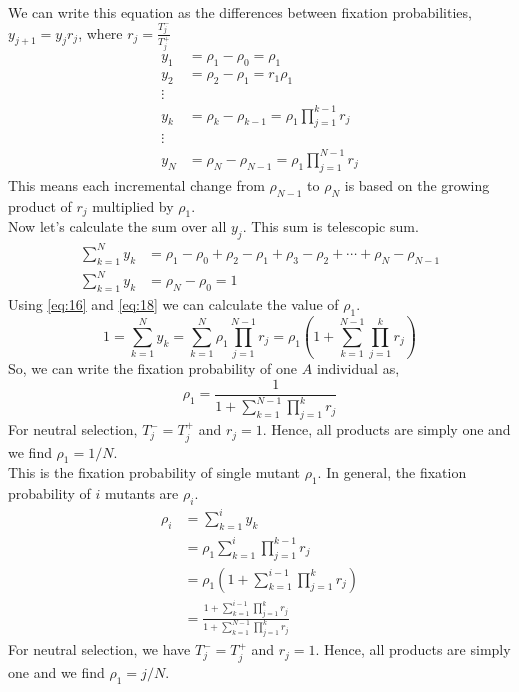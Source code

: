\documentclass{article}
\begin{document}
We can write this equation as the differences between fixation probabilities, $y_{j+1}=y_jr_j$, where $r_j=\frac{T_j^-}{T_j^+}$
\begin{align}
y_1 &= \rho_1 - \rho_0 = \rho_1 \nonumber\\
y_2 &= \rho_2 - \rho_1 = r_1 \rho_1 \nonumber\\
\vdots \nonumber\\
y_k &= \rho_k - \rho_{k-1} = \rho_1 \prod_{j=1}^{k-1} r_j \label{eq:18}\\
\vdots \nonumber\\
y_N &= \rho_N - \rho_{N-1} = \rho_1 \prod_{j=1}^{N-1} r_j \label{eq:19}
\end{align}
This means each incremental change from $\rho_{N-1}$ to $\rho_N$ is based on the growing product of $r_j$ multiplied by $\rho_1$.\\
Now let's calculate the sum over all $y_j$. This sum is telescopic sum.
\begin{align}
\sum_{k=1}^N y_k &= \rho_1-\rho_0+ \rho_2-\rho_1+ \rho_3-\rho_2+\cdots+\rho_N-\rho_{N-1} \nonumber\\
\sum_{k=1}^N y_k &= \rho_N-\rho_0=1 \label{eq:20}
\end{align}
Using \eqref{eq:16} and \eqref{eq:18} we can calculate the value of $\rho_1$.
\begin{equation}
1=\sum_{k=1}^N y_k=\sum_{k=1}^N \rho_1 \prod_{j=1}^{N-1}r_j=\rho_1(1+ \sum_{k=1}^{N-1}\prod_{j=1}^k r_j)\label{eq:21}
\end{equation}
So, we can write the fixation probability of one $A$ individual as,
\begin{equation}
\rho_1= \frac{1}{1+ \sum_{k=1}^{N-1}\prod_{j=1}^k r_j} \label{eq:22}
\end{equation}
For neutral selection, $T_j^-=T_j^+$ and $r_j=1$. Hence, all products are simply one and we find $\rho_1= 1/N$.\\
This is the fixation probability of single mutant $\rho_1$. In general, the fixation probability of $i$ mutants are $\rho_i$.
\begin{align}
\rho_i&= \sum_{k=1}^i y_k \nonumber\\
&= \rho_1 \sum_{k=1}^i \prod_{j=1}^{k-1}r_j\nonumber\\
&=\rho_1(1+ \sum_{k=1}^{i-1} \prod_{j=1}^k r_j)\nonumber\\
&= \frac{1+\sum_{k=1}^{i-1}\prod_{j=1}^k r_j}{1+ \sum_{k=1}^{N-1}\prod_{j=1}^k r_j} \label{eq:23}
\end{align}
For neutral selection, we have $T_j^-=T_j^+$ and $r_j=1$. Hence, all products are simply one and we find $\rho_1= j/N$.\\
\end{document}
